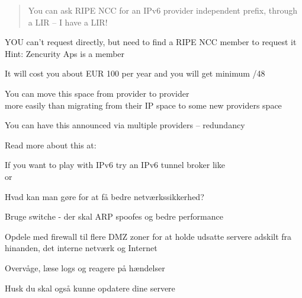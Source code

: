 \documentclass[Screen16to9,17pt]{foils}
\begin{document}


\begin{quote}
You can ask RIPE NCC for an IPv6 provider independent prefix, through a LIR -- I have a LIR!
\end{quote}

\begin{list2}
\item YOU can't request directly, but need to find a RIPE NCC member to request it\\
Hint: Zencurity Aps is a member
\item It will cost you about EUR 100 per year and you will get minimum /48
\item You can move this space from provider to provider\\
more easily than migrating from their IP space to some new providers space
\item You can have this announced via multiple providers -- redundancy
\item Read more about this at:\\
\item If you want to play with IPv6 try an IPv6 tunnel broker like\\
 or 
\end{list2}





\begin{list1}
\item Hvad kan man gøre for at få bedre netværkssikkerhed?
\begin{list2}
\item Bruge switche - der skal ARP spoofes og bedre performance
\item Opdele med firewall til flere DMZ zoner for at holde
      udsatte servere adskilt fra hinanden, det interne netværk og
      Internet
\item Overvåge, læse logs og reagere på hændelser
\end{list2}
\item Husk du skal også kunne opdatere dine servere
\end{list1}



\end{document}
